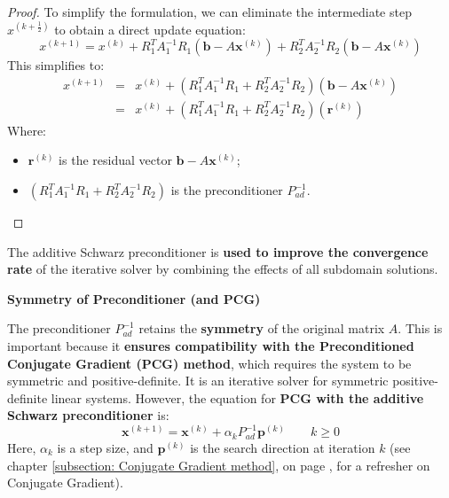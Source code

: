 \begin{proof}
    To simplify the formulation, we can eliminate the intermediate step $x^{\left(k+\frac{1}{2}\right)}$ to obtain a direct update equation:
    \begin{equation*}
        x^{\left(k+1\right)} = x^{\left(k\right)} + R_{1}^{T}A_{1}^{-1}R_{1}\left(\mathbf{b} - A\mathbf{x}^{\left(k\right)}\right) + R_{2}^{T}A_{2}^{-1}R_{2}\left(\mathbf{b} - A\mathbf{x}^{\left(k\right)}\right)
    \end{equation*}
    This simplifies to:
    \begin{equation*}
        \begin{array}{rcl}
            x^{\left(k+1\right)} &=& x^{\left(k\right)} + \left(
                R_{1}^{T}A_{1}^{-1}R_{1} + R_{2}^{T}A_{2}^{-1}R_{2}
            \right) \left(\mathbf{b} - A\mathbf{x}^{\left(k\right)}\right) \\ [.7em]
            &=& x^{\left(k\right)} + \left(
                R_{1}^{T}A_{1}^{-1}R_{1} + R_{2}^{T}A_{2}^{-1}R_{2}
            \right) \left(\mathbf{r}^{\left(k\right)}\right)
        \end{array}
    \end{equation*}
    Where:
    \begin{itemize}
        \item $\mathbf{r}^{\left(k\right)}$ is the residual vector $\mathbf{b} - A\mathbf{x}^{\left(k\right)}$;
        \item $\left(R_{1}^{T}A_{1}^{-1}R_{1} + R_{2}^{T}A_{2}^{-1}R_{2}\right)$ is the preconditioner $P_{ad}^{-1}$.
    \end{itemize}
\end{proof}

\noindent
The additive Schwarz preconditioner is \textbf{used to improve the convergence rate} of the iterative solver by combining the effects of all subdomain solutions.

\highspace
\begin{flushleft}
    \textcolor{Green3}{ \textbf{Symmetry of Preconditioner (and PCG)}}
\end{flushleft}
The preconditioner $P_{ad}^{-1}$ retains the \textbf{symmetry} of the original matrix $A$. This is important because it \textbf{ensures compatibility with the Preconditioned Conjugate Gradient (PCG) method}, which requires the system to be symmetric and positive-definite. It is an iterative solver for symmetric positive-definite linear systems. However, the equation for \textbf{PCG with the additive Schwarz preconditioner} is:
\begin{equation}
    \mathbf{x}^{\left(k+1\right)} = \mathbf{x}^{\left(k\right)} + \alpha_{k}P^{-1}_{ad}\mathbf{p}^{\left(k\right)} \hspace{2em} k \ge 0
\end{equation}
Here, $\alpha_{k}$ is a step size, and $\mathbf{p}^{\left(k\right)}$ is the search direction at iteration $k$ (see chapter \ref{subsection: Conjugate Gradient method}, on page \pageref{subsection: Conjugate Gradient method}, for a refresher on Conjugate Gradient).

